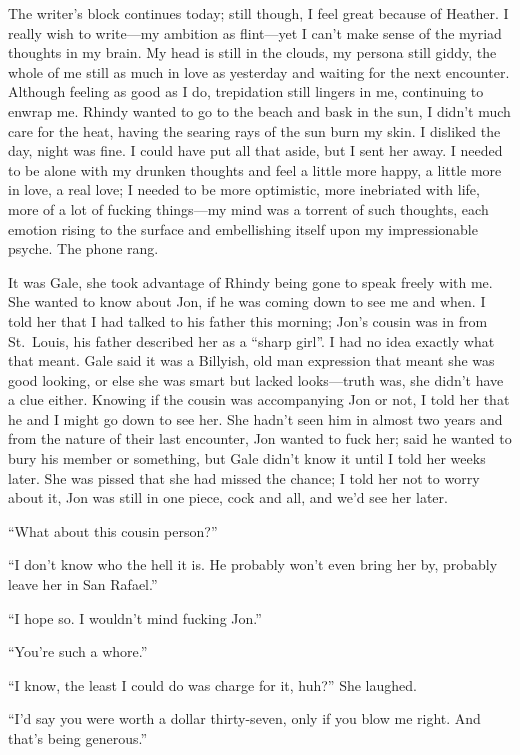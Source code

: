 The writer's block continues today; still though, I feel great because
of Heather. I really wish to write---my ambition as flint---yet I can't
make sense of the myriad thoughts in my brain. My head is still in the
clouds, my persona still giddy, the whole of me still as much in love as
yesterday and waiting for the next encounter. Although feeling as good
as I do, trepidation still lingers in me, continuing to enwrap me.
Rhindy wanted to go to the beach and bask in the sun, I didn't much care
for the heat, having the searing rays of the sun burn my skin. I
disliked the day, night was fine. I could have put all that aside, but I
sent her away. I needed to be alone with my drunken thoughts and feel a
little more happy, a little more in love, a real love; I needed to be
more optimistic, more inebriated with life, more of a lot of fucking
things---my mind was a torrent of such thoughts, each emotion rising to
the surface and embellishing itself upon my impressionable psyche. The
phone rang.

It was Gale, she took advantage of Rhindy being gone to speak freely
with me. She wanted to know about Jon, if he was coming down to see me
and when. I told her that I had talked to his father this morning; Jon's
cousin was in from St.~Louis, his father described her as a ``sharp
girl''. I had no idea exactly what that meant. Gale said it was a
Billyish, old man expression that meant she was good looking, or else
she was smart but lacked looks---truth was, she didn't have a clue
either. Knowing if the cousin was accompanying Jon or not, I told her
that he and I might go down to see her. She hadn't seen him in almost
two years and from the nature of their last encounter, Jon wanted to
fuck her; said he wanted to bury his member or something, but Gale
didn't know it until I told her weeks later. She was pissed that she had
missed the chance; I told her not to worry about it, Jon was still in
one piece, cock and all, and we'd see her later.

``What about this cousin person?''

``I don't know who the hell it is. He probably won't even bring her by,
probably leave her in San Rafael.''

``I hope so. I wouldn't mind fucking Jon.''

``You're such a whore.''

``I know, the least I could do was charge for it, huh?'' She laughed.

``I'd say you were worth a dollar thirty-seven, only if you blow me
right. And that's being generous.''

